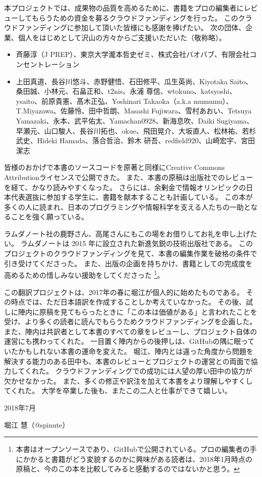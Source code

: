 本プロジェクトでは、成果物の品質を高めるために、書籍をプロの編集者にレビューしてもらうための資金を募るクラウドファンディングを行った。
このクラウドファンディングに参加して頂いた皆様にも感謝を捧げたい。
次の団体、企業、個人をはじめとして沢山の方々からご支援いただいた（敬称略）。 %
\begin{itemize}
\item 斉藤淳（J PREP）、東京大学瀧本哲史ゼミ、株式会社バオバブ、有限会社コンセントレーション
\item 上田真道、長谷川悠斗、赤野健悟、石田修平、瓜生英尚、Kiyotaka Saito、桑田誠、小林元、石畠正和、t2nis、永浦 尊信、wtokuno、katsyoshi、ysaito、前原貴憲、髙木正弘、Yoshinari Takaoka（a.k.a mumumu）、T.Miyazawa、佐藤怜、田中哲朗、Masashi Fujiwara、雪村あおい、Tetsuya Yamazaki、永本、武平佑太、Yamachan0928、新海息吹、Daiki Sugiyama、早瀬元、山口駿人、長谷川拓也、okue、飛田晃介、大坂直人、松林祐、若杉武史、Hideki Hamada、落合哲治、鈴木 研吾、redfield920、山崎宏宇、宮田潔志
\end{itemize}

皆様のおかげで本書のソースコードを原著と同様にCreative Commons Attributionライセンスで公開できた。
また、本書の原稿は出版社でのレビューを経て、かなり読みやすくなった。
さらには、余剰金で情報オリンピックの日本代表選抜に参加する学生に、書籍を献本することも計画している。
この本が多くの人に読まれ、日本のプログラミングや情報科学を支える人たちの一助となることを強く願っている。

ラムダノート社の鹿野さん、高尾さんにもこの場をお借りしてお礼を申し上げたい。
ラムダノートは 2015 年に設立された新進気鋭の技術出版社である。
このプロジェクトのクラウドファンディングを見て、本書の編集作業を破格の条件で引き受けてくださった。
また、出版の企画を持ちかけ、書籍としての完成度を高めるための惜しみない援助をしてくださった
\footnote{本書はオープンソースであり、GitHubで公開されている。プロの編集者の手にかかると書籍がどう変貌するのかに興味がある読者は、2018年1月時点の原稿と、今のこの本を比較してみると感動するのではないかと思う。}。

この翻訳プロジェクトは、2017年の春に堀江が個人的に始めたものである。
その時点では、ただ日本語訳を作成することしか考えていなかった。
その後、試しに陣内に原稿を見てもらったときに「この本は価値がある」と言われたことを受け、より多くの読者に読んでもらうためクラウドファンディングを企画した。
また、陣内は共訳者として本書のすべての章をレビューし、プロジェクト自体の運営にも携わってくれた。
一目置く陣内からの後押しは、GitHubの隅に眠っていたかもしれない本書の運命を変えた。
堀江、陣内とは違った角度から問題を解決する能力のある田中も、本書のレビューとプロジェクトの運営との両面で協力してくれた。
クラウドファンディングでの成功には人望の厚い田中の協力が欠かせなかった。
また、多くの修正や訳注を加えて本書をより理解しやすくしてくれた。
大学を卒業した後も、またこの二人と仕事ができて嬉しい。

\noindent\hspace*{2em}
2018年7月

\hfill 堀江 慧（@spinute）

